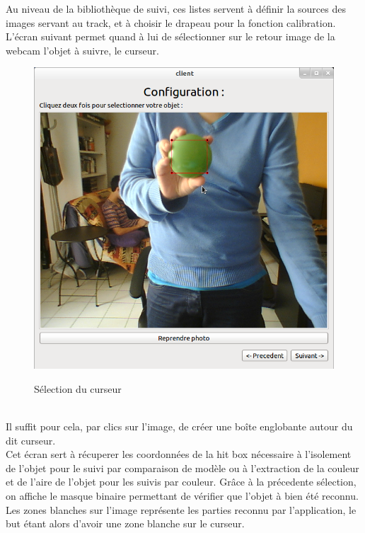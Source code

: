\documentclass{report}
\begin{document}
				Au niveau de la bibliothèque de suivi, ces listes servent à définir la sources des images servant au track, et à choisir le drapeau pour la fonction calibration.
				\newpage
				L'écran suivant permet quand à lui de sélectionner sur le retour image de la webcam l'objet à suivre, le curseur.\\
				\begin{figure}[!h]
						\centering
						\includegraphics[scale=0.38]{../images/Capture1.png}\\
						\caption{Sélection du curseur}
						\label{Sélection du curseur}
				\end{figure}\\
				Il suffit pour cela, par clics sur l'image, de créer une boîte englobante autour du dit curseur.\\
				Cet écran sert à récuperer les coordonnées de la hit box nécessaire à l'isolement de l'objet pour le suivi par comparaison de modèle ou à l'extraction de la couleur et de l'aire de l'objet pour les suivis par couleur.
				\newpage
				Grâce à la précedente sélection, on affiche le masque binaire permettant de vérifier que l'objet à bien été reconnu. Les zones blanches sur l'image représente les parties reconnu par l'application, le but étant alors d'avoir une zone blanche sur le curseur.
\end{document}
